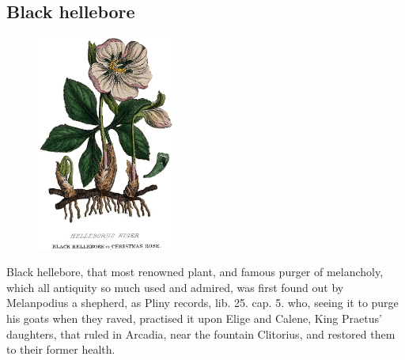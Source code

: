 {\subsection{Black hellebore}
\begin{figure}
  \begingroup
  \includegraphics[keepaspectratio,width=0.4\textwidth]{figures/Helleborus-Niger-small.jpg}
  \label{fig:helleborusniger2}
\end{figure}
Black hellebore, that most renowned plant, and famous purger of
melancholy, which all antiquity so much used and admired, was first
found out by Melanpodius a shepherd, as Pliny records, lib. 25. cap. 5.
who, seeing it to purge his goats when they raved, practised it
upon Elige and Calene, King Praetus' daughters, that ruled in Arcadia,
near the fountain Clitorius, and restored them to their former health.

}

